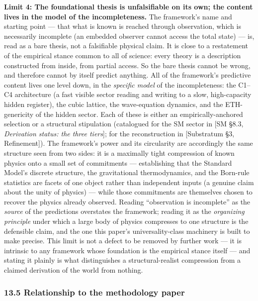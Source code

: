 \documentclass[
]{article}
\begin{document}
\textbf{Limit 4: The foundational thesis is unfalsifiable on its own;
the content lives in the model of the incompleteness.} The framework's
name and starting point --- that what is known is reached through
observation, which is necessarily incomplete (an embedded observer
cannot access the total state) --- is, read as a bare thesis, not a
falsifiable physical claim. It is close to a restatement of the
empirical stance common to all of science: every theory is a description
constructed from inside, from partial access. So the bare thesis cannot
be wrong, and therefore cannot by itself predict anything. All of the
framework's predictive content lives one level down, in the
\emph{specific model} of the incompleteness: the C1--C4 architecture (a
fast visible sector reading and writing to a slow, high-capacity hidden
register), the cubic lattice, the wave-equation dynamics, and the
ETH-genericity of the hidden sector. Each of these is either an
empirically-anchored selection or a structural stipulation (catalogued
for the SM sector in {[}SM §8.3, \emph{Derivation status: the three
tiers}{]}; for the reconstruction in {[}Substratum §3, Refinement{]}).
The framework's power and its circularity are accordingly the same
structure seen from two sides: it is a maximally tight compression of
known physics onto a small set of commitments --- establishing that the
Standard Model's discrete structure, the gravitational thermodynamics,
and the Born-rule statistics are facets of one object rather than
independent inputs (a genuine claim about the unity of physics) ---
while those commitments are themselves chosen to recover the physics
already observed. Reading ``observation is incomplete'' as the
\emph{source} of the predictions overstates the framework; reading it as
the \emph{organizing principle} under which a large body of physics
compresses to one structure is the defensible claim, and the one this
paper's universality-class machinery is built to make precise. This
limit is not a defect to be removed by further work --- it is intrinsic
to any framework whose foundation is the empirical stance itself --- and
stating it plainly is what distinguishes a structural-realist
compression from a claimed derivation of the world from nothing.

\hypertarget{relationship-to-the-methodology-paper}{%
\subsubsection{13.5 Relationship to the methodology
paper}\label{relationship-to-the-methodology-paper}}
\end{document}
